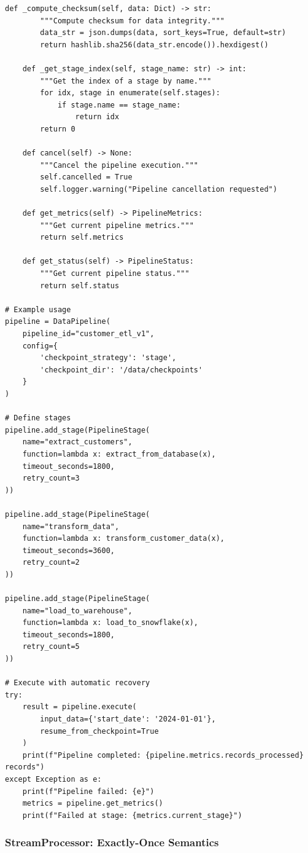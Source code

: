 \begin{lstlisting}[style=python, caption=DataPipeline with Full Lifecycle Management]
    def _compute_checksum(self, data: Dict) -> str:
        """Compute checksum for data integrity."""
        data_str = json.dumps(data, sort_keys=True, default=str)
        return hashlib.sha256(data_str.encode()).hexdigest()

    def _get_stage_index(self, stage_name: str) -> int:
        """Get the index of a stage by name."""
        for idx, stage in enumerate(self.stages):
            if stage.name == stage_name:
                return idx
        return 0

    def cancel(self) -> None:
        """Cancel the pipeline execution."""
        self.cancelled = True
        self.logger.warning("Pipeline cancellation requested")

    def get_metrics(self) -> PipelineMetrics:
        """Get current pipeline metrics."""
        return self.metrics

    def get_status(self) -> PipelineStatus:
        """Get current pipeline status."""
        return self.status

# Example usage
pipeline = DataPipeline(
    pipeline_id="customer_etl_v1",
    config={
        'checkpoint_strategy': 'stage',
        'checkpoint_dir': '/data/checkpoints'
    }
)

# Define stages
pipeline.add_stage(PipelineStage(
    name="extract_customers",
    function=lambda x: extract_from_database(x),
    timeout_seconds=1800,
    retry_count=3
))

pipeline.add_stage(PipelineStage(
    name="transform_data",
    function=lambda x: transform_customer_data(x),
    timeout_seconds=3600,
    retry_count=2
))

pipeline.add_stage(PipelineStage(
    name="load_to_warehouse",
    function=lambda x: load_to_snowflake(x),
    timeout_seconds=1800,
    retry_count=5
))

# Execute with automatic recovery
try:
    result = pipeline.execute(
        input_data={'start_date': '2024-01-01'},
        resume_from_checkpoint=True
    )
    print(f"Pipeline completed: {pipeline.metrics.records_processed} records")
except Exception as e:
    print(f"Pipeline failed: {e}")
    metrics = pipeline.get_metrics()
    print(f"Failed at stage: {metrics.current_stage}")
\end{lstlisting}

\subsubsection{StreamProcessor: Exactly-Once Semantics}

